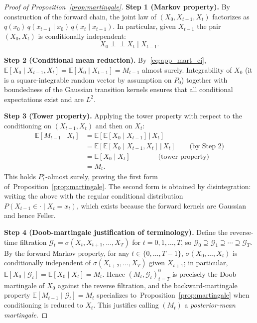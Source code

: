 \documentclass{article}
\theoremstyle{plain}
\theoremstyle{definition}
\theoremstyle{remark}
\begin{document}
\begin{proof}[Proof of Proposition~\ref{prop:martingale}]
\textbf{Step 1 (Markov property).}
By construction of the forward chain, the joint law of \((X_0,X_{t-1},X_t)\)
factorizes as
\(q(x_0)\,q(x_{t-1}\mid x_0)\,q(x_t\mid x_{t-1})\). In particular, given
\(X_{t-1}\) the pair \((X_0, X_t)\) is conditionally independent:
\begin{equation}
X_0 \perp\!\!\!\perp X_t \;\big|\; X_{t-1}.
\label{eq:app_mart_ci}
\end{equation}

\textbf{Step 2 (Conditional mean reduction).}
By~\eqref{eq:app_mart_ci},
\(\mathbb{E}[X_0 \mid X_{t-1}, X_t] = \mathbb{E}[X_0 \mid X_{t-1}] = M_{t-1}\)
almost surely. Integrability of \(X_0\) (it is a square-integrable random
vector by assumption on \(P_0\)) together with boundedness of the Gaussian
transition kernels ensures that all conditional expectations exist and are
\(L^2\).

\textbf{Step 3 (Tower property).}
Applying the tower property with respect to the conditioning on
\((X_{t-1},X_t)\) and then on \(X_t\):
\begin{align*}
\mathbb{E}[M_{t-1} \mid X_t]
&= \mathbb{E}\!\left[\mathbb{E}[X_0\mid X_{t-1}] \,\big|\, X_t\right] \\
&= \mathbb{E}\!\left[\mathbb{E}[X_0 \mid X_{t-1}, X_t] \,\big|\, X_t\right]
  \qquad\text{(by Step 2)} \\
&= \mathbb{E}[X_0 \mid X_t]
  \qquad\qquad\text{(tower property)} \\
&= M_t.
\end{align*}
This holds \(P_t^\star\)-almost surely, proving the first form
of~Proposition~\ref{prop:martingale}. The second form is obtained by disintegration:
writing the above with the regular conditional distribution \(P(X_{t-1}\in
\cdot \mid X_t = x_t)\), which exists because the forward kernels are
Gaussian and hence Feller.

\textbf{Step 4 (Doob-martingale justification of terminology).}
Define the reverse-time filtration
\(\mathcal{G}_t = \sigma(X_t, X_{t+1}, \dots, X_T)\) for
\(t=0,1,\dots,T\), so \(\mathcal{G}_0 \supseteq \mathcal{G}_1 \supseteq \cdots
\supseteq \mathcal{G}_T\). By the forward Markov property, for any
\(t\in\{0,\dots,T-1\}\),
\(\sigma(X_0,\dots,X_t)\) is conditionally independent of
\(\sigma(X_{t+2},\dots,X_T)\) given \(X_{t+1}\); in particular,
\(\mathbb{E}[X_0 \mid \mathcal{G}_t] = \mathbb{E}[X_0 \mid X_t] = M_t\).
Hence \((M_t,\mathcal{G}_t)_{t=T}^{0}\) is precisely the Doob martingale of
\(X_0\) against the reverse filtration, and the backward-martingale property
\(\mathbb{E}[M_{t-1} \mid \mathcal{G}_t] = M_t\) specializes
to~Proposition~\ref{prop:martingale} when conditioning is reduced to \(X_t\). This
justifies calling \((M_t)\) a \emph{posterior-mean martingale}.
\end{proof}
\end{document}
